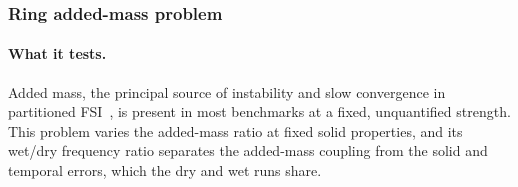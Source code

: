 \subsubsection{Ring added-mass problem}\label{sec:ring}

\paragraph{What it tests.}
Added mass, the principal source of instability and slow convergence in partitioned FSI~\citep{Causin2005}, is present in most benchmarks at a fixed, unquantified strength.
This problem varies the added-mass ratio at fixed solid properties, and its wet/dry frequency ratio separates the added-mass coupling from the solid and temporal errors, which the dry and wet runs share.

